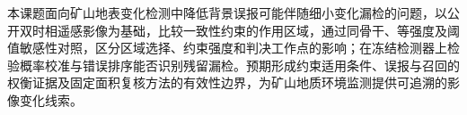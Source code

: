 本课题面向矿山地表变化检测中降低背景误报可能伴随细小变化漏检的问题，以公开双时相遥感影像为基础，比较一致性约束的作用区域，通过同骨干、等强度及阈值敏感性对照，区分区域选择、约束强度和判决工作点的影响；在冻结检测器上检验概率校准与错误排序能否识别残留漏检。预期形成约束适用条件、误报与召回的权衡证据及固定面积复核方法的有效性边界，为矿山地质环境监测提供可追溯的影像变化线索。
